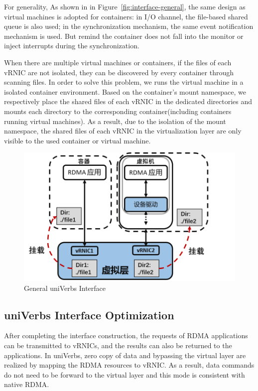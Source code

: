  For generality, As shown in in Figure~\ref{fig:interface-general}, the same design as virtual machines is adopted for containers: in I/O channel, the file-based shared queue is also used; in the synchronization mechanism, the same event notification mechanism is used. But remind the container does not fall into the monitor or inject interrupts during the synchronization.

When there are multiple virtual machines or containers, if the files of each vRNIC are not isolated, they can be discovered by every container through scanning files. In order to solve this problem, we runs the virtual machine in a isolated container environment. Based on the container's mount namespace, we respectively place the shared files of each vRNIC in the dedicated directories and mounts each directory to the corresponding container(including containers running virtual machines). As a result, due to the isolation of the mount namespace, the shared files of each vRNIC in the virtualization layer are only visible to the used container or virtual machine.  

\begin{figure}[!ht]
	\centering
	\includegraphics[width=1.0\linewidth]{images/interface-isolate}
	\caption{General uniVerbs Interface}
	\label{fig:interface-isolate}
\end{figure}

\subsection{uniVerbs Interface Optimization}
After completing the interface construction, the requests of RDMA applications can be transmitted to vRNICs, and the results can also be returned to the applications. In uniVerbs, zero copy of data and bypassing the virtual layer are realized by mapping the RDMA resources to vRNIC. As a result, data commands do not need to be forward to the virtual layer and this mode is consistent with native RDMA.

